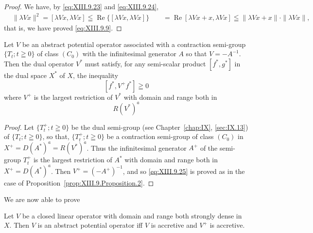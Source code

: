 \begin{proof}
 We have, by \eqref{eq:XIII.9.23} and \eqref{eq:XIII.9.24}, 
\[
\begin{aligned}
&{\| \lambda V x \| ^{2} = [ \lambda V x, \lambda V x ] \leqq \operatorname{Re} \{[ \lambda V x, \lambda V x ] \}} {\qquad = \operatorname{Re} [ \lambda V x + x, \lambda V x ] \leqq \| \lambda V x + x \| \cdot \| \lambda V x \|,}
\end{aligned}
\]
that is, we have proved \eqref{eq:XIII.9.9}. 
\end{proof}

\begin{proposition}\label{prop:XIII.9.Proposition.4} Let $V$ be an abstract potential operator associated with a contraction semi-group $\{T_{t}; t \geqq 0\}$ of class $(C_{0})$ with the infinitesimal generator $A$ so that $V = -A^{-1}$. Then the dual operator $V^{*}$ must satisfy, for any semi-scalar product $[f^{*}, g^{*}]$ in the dual space $X^{*}$ of $X$, the inequality 
\begin{equation}\label{eq:XIII.9.25}
[ f ^{*}, V ^{+} f ^{*} ] \geqq 0
\end{equation}
where 
$V^{+}$ is the largest restriction of $V^{*}$ with domain and range both in 
\begin{equation}\label{eq:XIII.9.26}
R (V ^{*}) ^{a}
\end{equation}
\end{proposition}

\begin{proof}
 Let $\{T_t^+; t \geqq 0\}$ be the dual semi-group (see Chapter~\ref{chap:IX}, \ref{sec:IX.13}) of $\{T_t; t \geqq 0\}$, so that, $\{T_t^+; t \geqq 0\}$ be a contraction semi-group of class $(C_0)$ in $X^+ = D(A^*)^a = R(V^*)^a$. Thus the infinitesimal generator $A^+$ of the semi-group $T_t^+$ is the largest restriction of $A^*$ with domain and range both in $X^+ = D(A^*)^a$. Then $V^+ = (-A^+)^{-1}$, and so \eqref{eq:XIII.9.25} is proved as in the case of Proposition~\ref{prop:XIII.9.Proposition.2}. 
\end{proof}

We are now able to prove 

\begin{theorem}\label{thm:XIII.9.Theorem.3} Let $V$ be a closed linear operator with domain and range both strongly dense in $X$. Then $V$ is an abstract potential operator iff $V$ is accretive and $V^{+}$ is accretive. 
\end{theorem}

